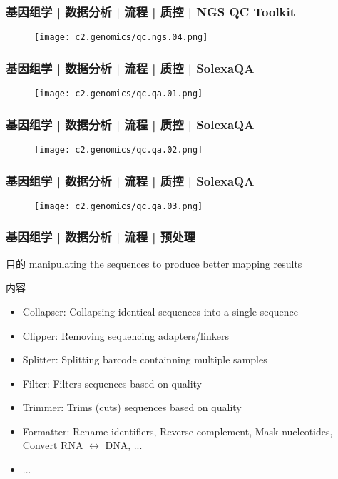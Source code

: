 \begin{frame}
  \frametitle{基因组学 | 数据分析 | 流程 | 质控 | NGS QC Toolkit}
  \begin{figure}
    \centering
    \texttt{[image: c2.genomics/qc.ngs.04.png]}
  \end{figure}
\end{frame}

\begin{frame}
  \frametitle{基因组学 | 数据分析 | 流程 | 质控 | SolexaQA}
  \begin{figure}
    \centering
    \texttt{[image: c2.genomics/qc.qa.01.png]}
  \end{figure}
\end{frame}

\begin{frame}
  \frametitle{基因组学 | 数据分析 | 流程 | 质控 | SolexaQA}
  \begin{figure}
    \centering
    \texttt{[image: c2.genomics/qc.qa.02.png]}
  \end{figure}
\end{frame}

\begin{frame}
  \frametitle{基因组学 | 数据分析 | 流程 | 质控 | SolexaQA}
  \begin{figure}
    \centering
    \texttt{[image: c2.genomics/qc.qa.03.png]}
  \end{figure}
\end{frame}

\begin{frame}
  \frametitle{基因组学 | 数据分析 | 流程 | 预处理}
  \begin{block}{目的}
 manipulating the sequences to produce better mapping results 
  \end{block}
  \pause
  \begin{block}{内容}
    \begin{itemize}
      \item Collapser: Collapsing identical sequences into a single sequence
      \item Clipper: Removing sequencing adapters/linkers
      \item Splitter: Splitting barcode containning multiple samples 
      \item Filter: Filters sequences based on quality
      \item Trimmer: Trims (cuts) sequences based on quality
      \item Formatter: Rename identifiers, Reverse-complement, Mask nucleotides, Convert RNA $\leftrightarrow$ DNA, ...
      \item ...
    \end{itemize}
  \end{block}
\end{frame}

